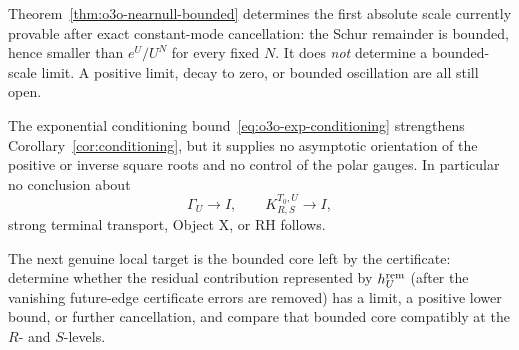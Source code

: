 \begin{remark}[R16 firewall]\label{rem:o3o-firewall}
Theorem~\ref{thm:o3o-nearnull-bounded} determines the first absolute scale currently
provable after exact constant-mode cancellation: the Schur remainder is bounded, hence
smaller than $e^U/U^N$ for every fixed $N$.  It does \emph{not} determine a bounded-scale
limit.  A positive limit, decay to zero, or bounded oscillation are all still open.

The exponential conditioning bound~\eqref{eq:o3o-exp-conditioning} strengthens
Corollary~\ref{cor:conditioning}, but it supplies no asymptotic orientation of the
positive or inverse square roots and no control of the polar gauges.  In particular no
conclusion about
\[
 \Gamma_U\to I,
 \qquad
 K_{R,S}^{T_0,U}\to I,
\]
strong terminal transport, Object X, or RH follows.

The next genuine local target is the bounded core left by the certificate: determine
whether the residual contribution represented by $h_U^{\rm rem}$ (after the vanishing
future-edge certificate errors are removed) has a limit, a positive lower bound, or
further cancellation, and compare that bounded core compatibly at the $R$- and
$S$-levels.
\end{remark}
